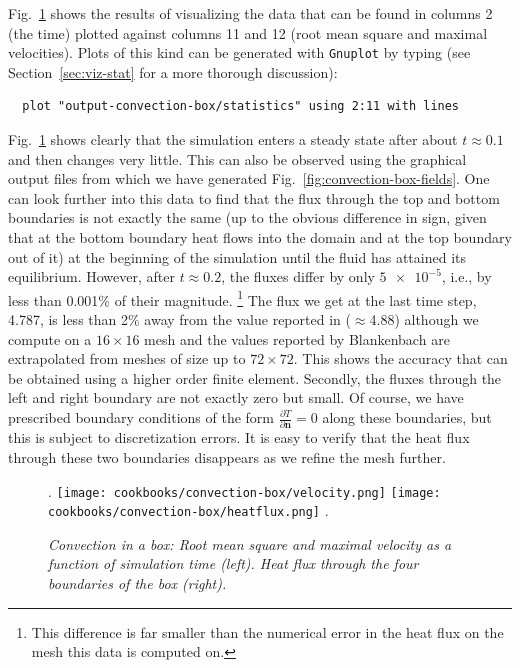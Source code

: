 \documentclass{article}
\begin{document}
Fig.~\ref{fig:convection-box-stats} shows the results of visualizing the data
that can be found in columns 2 (the time) plotted against columns 11 and 12
(root mean square and maximal velocities). Plots of this kind can be generated with
\texttt{Gnuplot} by typing (see Section~\ref{sec:viz-stat} for a more thorough
discussion):
\begin{verbatim}
  plot "output-convection-box/statistics" using 2:11 with lines
\end{verbatim}
Fig.~\ref{fig:convection-box-stats} shows clearly that the simulation
enters a steady state after about $t\approx 0.1$ and then changes very little. This can also be observed using the
graphical output files from which we have generated
Fig.~\ref{fig:convection-box-fields}. One can look further into this data to
find that the flux through the top and bottom boundaries is not exactly the same
(up to the obvious difference in sign, given that at the bottom boundary heat
flows into the domain and at the top boundary out of it) at the beginning of the
simulation until the fluid has attained its equilibrium. However, after
$t\approx 0.2$, the fluxes differ by only $\num{5e-5}$, i.e., by less than
0.001\% of their magnitude.%
\footnote{This difference is far smaller than the numerical error in the heat
flux on the mesh this data is computed on.}
The flux we get at the last time step, 4.787, is less than 2\% away from the
value reported in \cite{BBC89} ($\approx$4.88) although we compute on a $16\times 16$ mesh and
the values reported by Blankenbach are extrapolated from meshes of size up to
$72\times 72$. This shows the accuracy that can be obtained using a higher order
finite element. Secondly, the fluxes through the left and right boundary are not
exactly zero but small. Of course, we have prescribed boundary conditions of the
form $\frac{\partial T}{\partial \mathbf n}=0$ along these boundaries, but this
is subject to discretization errors. It is easy to verify that the heat flux
through these two boundaries disappears as we refine the mesh further.

\begin{figure}
\phantom.
\hfill
\texttt{[image: cookbooks/convection-box/velocity.png]}
\hfill
\texttt{[image: cookbooks/convection-box/heatflux.png]}
\hfill
\phantom.
\caption{\it Convection in a box: Root mean square and maximal velocity as a
function of simulation time (left). Heat flux through the four boundaries of
the box (right).}
\label{fig:convection-box-stats}
\end{figure}
\end{document}
